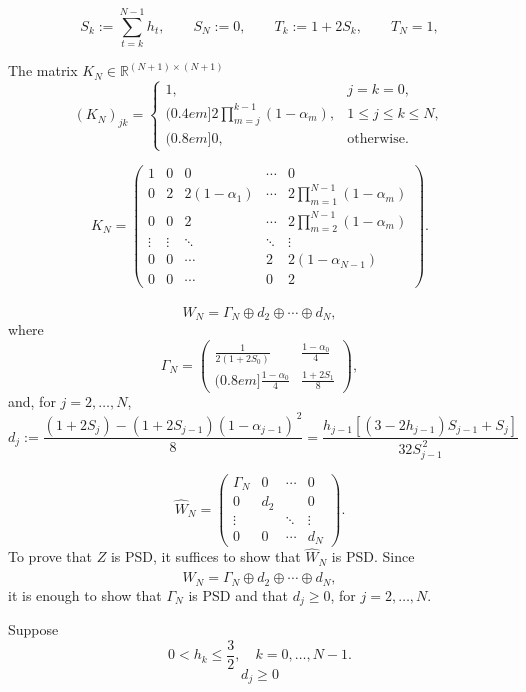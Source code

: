 \[
S_k:=\sum_{t=k}^{N-1}h_t,
\qquad
S_N:=0,
\qquad
T_k:=1+2S_k,
\qquad
T_N=1,
\]



The matrix \(K_N\in\mathbb{R}^{(N+1)\times(N+1)}\)
\[
(K_N)_{jk}
=
\begin{cases}
1,
& j=k=0,
\\(0.4em]
\displaystyle
2\prod_{m=j}^{k-1}(1-\alpha_m),
& 1\leq j\leq k\leq N,
\\(0.8em]
0,
& \text{otherwise}.
\end{cases}
\]


\[
K_N=
\begin{pmatrix}
1
&0
&0
&\cdots
&0
\\
0
&2
&2(1-\alpha_1)
&\cdots
&\displaystyle 2\prod_{m=1}^{N-1}(1-\alpha_m)
\\
0
&0
&2
&\cdots
&\displaystyle 2\prod_{m=2}^{N-1}(1-\alpha_m)
\\
\vdots
&\vdots
&\ddots
&\ddots
&\vdots
\\
0
&0
&\cdots
&2
&2(1-\alpha_{N-1})
\\
0
&0
&\cdots
&0
&2
\end{pmatrix}.
\]


\[
\widehat{W}_N
=
\Gamma_N
\oplus d_2
\oplus\cdots\oplus d_N,
\]
where
\[
\Gamma_N
=
\begin{pmatrix}
\displaystyle \frac{1}{2(1+2S_0)}
&
\displaystyle \frac{1-\alpha_0}{4}
\\(0.8em]
\displaystyle \frac{1-\alpha_0}{4}
&
\displaystyle \frac{1+2S_1}{8}
\end{pmatrix},
\]
and, for \(j=2,\ldots,N\),
\[
d_j
:=
\frac{(1+2S_j)-(1+2S_{j-1})(1-\alpha_{j-1})^{\,2}}{8}
=\frac{
h_{j-1}
\left[
(3-2h_{j-1})S_{j-1}+S_j
\right]
}{
32S_{j-1}^{\,2}
}\]





\[
\widehat{W}_N
=
\begin{pmatrix}
\Gamma_N
&
0
&
\cdots
&
0
\\
0
&
d_2
&&
0
\\
\vdots
&&
\ddots
&
\vdots
\\
0
&
0
&
\cdots
&
d_N
\end{pmatrix}.
\]
To prove that \(Z\) is PSD, it suffices to show that
\(\widehat{W}_N\) is PSD. Since
\[
\widehat{W}_N=\Gamma_N\oplus d_2\oplus\cdots\oplus d_N,
\]
it is enough to show that
$
\Gamma_N
$
is PSD and that \(d_j\geq 0\), for \(j=2,\ldots,N\).

\begin{lemma}
Suppose
\[
0<h_k\leq \frac{3}{2},\quad k=0,\ldots,N-1.
\]
\[d_j\ge 0\]

\end{lemma}

